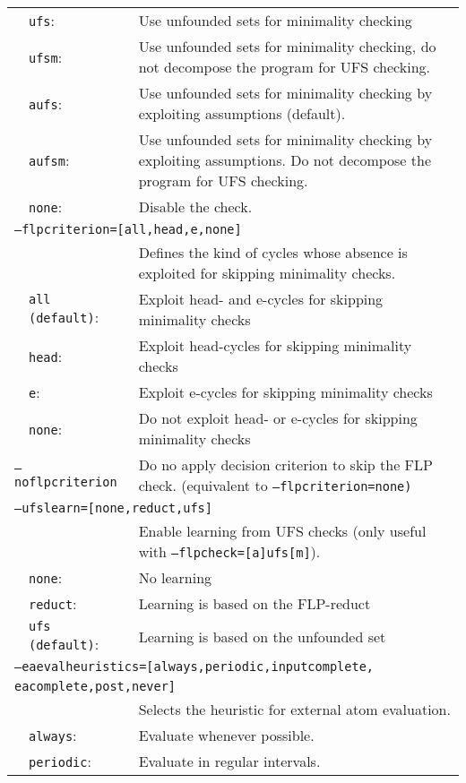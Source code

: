 \documentclass[a4paper, titlepage]{article}
\begin{document}
\begin{longtable}{ p{2.0em} p{2.2cm} p{0.6cm} p{8.0cm} }
&\texttt{ufs}:&&Use unfounded sets for minimality checking
\\
&\texttt{ufsm}:&&Use unfounded sets for minimality checking, do not decompose the program for UFS checking.\\
&\texttt{aufs}:&&Use unfounded sets for minimality checking by exploiting assumptions (default).\\
&\texttt{aufsm}:&&Use unfounded sets for minimality checking by exploiting assumptions. Do not decompose the program for UFS checking.\\
&\texttt{none}:&&Disable the check.\\
\multicolumn{4}{l}{\texttt{--flpcriterion=[all,head,e,none]}}\\
& & & Defines the kind of cycles whose absence is exploited for skipping minimality checks.\\
&\texttt{all (default)}:&&Exploit head- and e-cycles for skipping minimality checks\\
&\texttt{head}:&& Exploit head-cycles for skipping minimality checks\\
&\texttt{e}:&&Exploit e-cycles for skipping minimality checks\\
&\texttt{none}:&& Do not exploit head- or e-cycles for skipping minimality checks\\
\multicolumn{3}{l}{\texttt{--noflpcriterion}} &
  Do no apply decision criterion to skip the FLP check. (equivalent to \texttt{--flpcriterion=none)}\\
\multicolumn{4}{l}{\texttt{--ufslearn=[none,reduct,ufs]}} \\
&&&Enable learning from UFS checks (only useful with \texttt{--flpcheck=[a]ufs[m]}).\\
&\texttt{none}:&&No learning\\
&\texttt{reduct}:&&Learning is based on the FLP-reduct\\
&\texttt{ufs (default)}:&&Learning is based on the unfounded set\\
\multicolumn{4}{l}{\texttt{--eaevalheuristics=[always,periodic,inputcomplete,}}\\
\multicolumn{4}{l}{\texttt{\hphantom{--eaevalheuristics=[}eacomplete,post,never]}}\\
& & & Selects the heuristic for external atom evaluation.\\
&\texttt{always}:&&Evaluate whenever possible.\\
&\texttt{periodic}:&&Evaluate in regular intervals.\\

\end{longtable}
\end{document}
